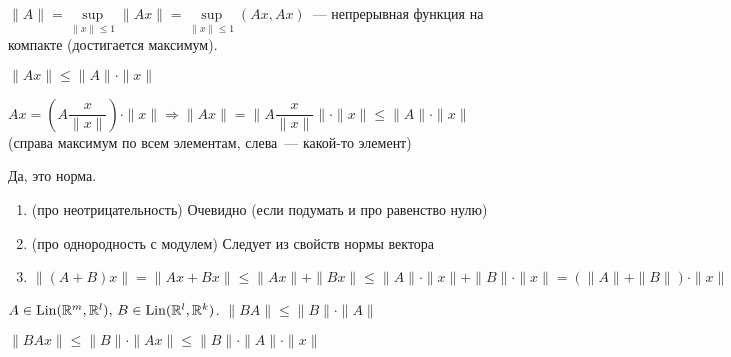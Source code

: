 \newpage
{}

\begin{defin*}
    $\|A\|=\sup\limits_{\|x\|\leqslant 1}\|Ax\|=\sup\limits_{\|x\|\leqslant 1}(Ax,Ax)$~--- непрерывная функция на компакте (достигается максимум).
\end{defin*}
\begin{Theorem*}
    $\|Ax\|\leqslant\|A\|\cdot\|x\|$
\end{Theorem*}
\begin{Proof}
    $Ax=(A\dfrac{x}{\|x\|})\cdot\|x\|\Rightarrow \|Ax\|=\|A\dfrac{x}{\|x\|}\|\cdot\|x\|\leqslant \|A\|\cdot\|x\|$ (справа максимум по всем элементам, слева~--- какой-то элемент)
\end{Proof}

\begin{Theorem*}{Да, это норма.}\end{Theorem*}
\begin{Proof}
    \begin{enumerate}
        \item (про неотрицательность) Очевидно (если подумать и про равенство нулю)
        \item (про однородность с модулем) Следует из свойств нормы вектора
        \item $\|(A+B)x\|=\|Ax+Bx\|\leqslant\|Ax\|+\|Bx\|\leqslant\|A\|\cdot\|x\|+\|B\|\cdot\|x\|=(\|A\|+\|B\|)\cdot\|x\|$
    \end{enumerate}
\end{Proof}

\begin{Theorem*}
    \newcommand{\Lin}{\operatorname{Lin}}
    $A\in\Lin(\rmy,\rmy[l]),\,B\in\Lin(\rmy[l],\rmy[k])$. \THEN $\|BA\|\leqslant \|B\|\cdot\|A\|$
\end{Theorem*}
\begin{Proof}
    $\|BAx\|\leqslant\|B\|\cdot\|Ax\|\leqslant\|B\|\cdot\|A\|\cdot\|x\|$
\end{Proof}

